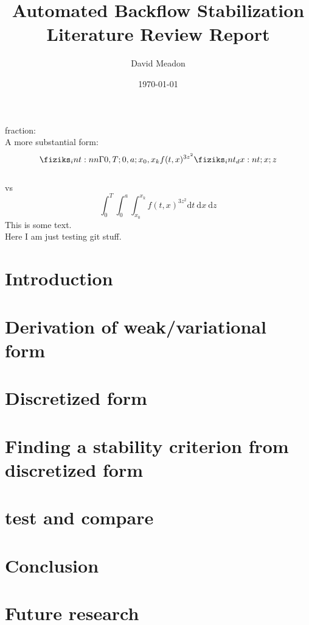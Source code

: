 \documentclass{article}
\title{Automated Backflow Stabilization\\
{\small Literature Review Report}}
\author{David Meadon}
\date{\today}
\begin{document}
\maketitle
fraction: \\
\noindent
A more substantial form: \[\Int[0,T;0,a;x_0, x_k]{f(t, x)^{3z^{2}}}[t;x;z]\]\\
vs \\
\[ \int^{T}_{0} \int^{a}_{0} \int^{x_k}_{x_0} f(t,x)^{3z^2} \text{d}t\ \text{d}x\ \text{d}z \]
This is some text.\\
Here I am just testing git stuff.
\section{Introduction}

\section{Derivation of weak/variational form}

\section{Discretized form}

\section{Finding a stability criterion from discretized form}

\section{test and compare}

\section{Conclusion}

\section{Future research}
\end{document}

